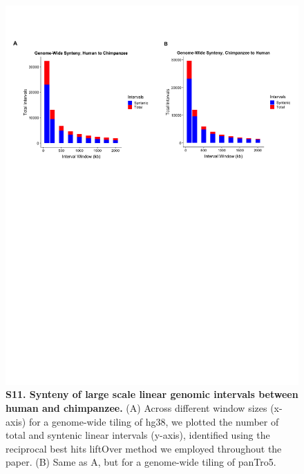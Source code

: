 \begin{figure}[!htb]
\centering
\includegraphics[width=6in]{img/figS11.pdf}
\caption[Synteny of large scale linear genomic intervals between human and chimpanzee.]{\textbf{S11. Synteny of large scale linear genomic intervals between human and chimpanzee.} (A) Across different window sizes (x-axis) for a genome-wide tiling of hg38, we plotted the number of total and syntenic linear intervals (y-axis), identified using the reciprocal best hits liftOver method \cite{Ward.2014, Kent.2002} we employed throughout the paper. (B) Same as A, but for a genome-wide tiling of panTro5.}
\label{fig:figS11}
\end{figure}

